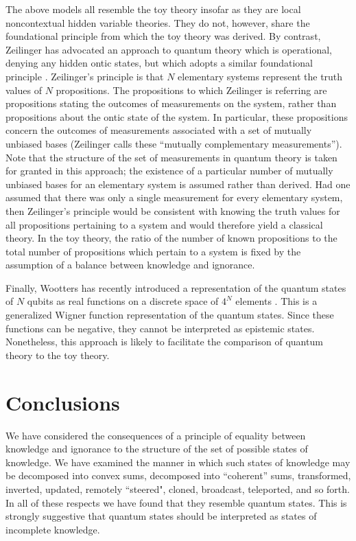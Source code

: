 \documentclass[pra,twocolumn,nofootinbib,showpacs]{revtex4}
\begin{document}
\strut The above models all resemble the toy theory insofar as
they are local noncontextual hidden variable theories. They do
not, however, share the foundational principle from which the toy
theory was derived. By contrast, Zeilinger has advocated an
approach to quantum theory which is operational, denying any
hidden ontic states, but which adopts a similar foundational
principle \cite{Zeilinger}. Zeilinger's principle is that $N$
elementary systems represent the truth values of $N$ propositions.
The propositions to which Zeilinger is referring are propositions
stating the outcomes of measurements on the system, rather than
propositions about the ontic state of the system. In particular,
these propositions concern the outcomes of measurements associated
with a set of mutually unbiased bases (Zeilinger calls these
``mutually complementary measurements''). Note that the structure
of the set of measurements in quantum theory is taken for granted
in this approach; the existence of a particular number of mutually
unbiased bases for an elementary system is assumed rather than
derived. Had one assumed that there was only a single measurement
for every elementary system, then Zeilinger's principle would be
consistent with knowing the truth values for all propositions
pertaining to a system and would therefore yield a classical
theory. In the toy theory, the ratio of the number of known
propositions to the total number of propositions which pertain to
a system is fixed by the assumption of a balance between knowledge
and ignorance.

Finally, Wootters has recently introduced a representation of the quantum
states of $N$ qubits as real functions on a discrete space of $4^{N}$
elements \cite{WoottersWignerfunctions}. This is a generalized Wigner
function representation of the quantum states. Since these functions can be
negative, they cannot be interpreted as epistemic states. Nonetheless, this
approach is likely to facilitate the comparison of quantum theory to the toy
theory.

\section{Conclusions}

\label{conclusions}

We have considered the consequences of a principle of equality between
knowledge and ignorance to the structure of the set of possible states of
knowledge. We have examined the manner in which such states of knowledge may
be decomposed into convex sums, decomposed into ``coherent'' sums,
transformed, inverted, updated, remotely ``steered", cloned, broadcast,
teleported, and so forth. In all of these respects we have found that they
resemble quantum states. This is strongly suggestive that quantum states
should be interpreted as states of incomplete knowledge.
\end{document}
